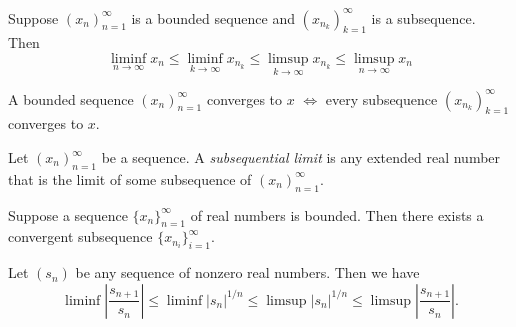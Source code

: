 \documentclass[../main.tex]{subfiles}
\begin{document}
    
    
    
    
    
    
    
    
    
    \begin{exercise}
    Suppose $ (x_n)^\infty_{n=1}$ is a bounded sequence and $ (x_{n_k})^\infty_{k = 1}$ is a subsequence. Then
    \[
    \liminf_{n \to \infty} x_n \leq \liminf_{k \to \infty} x_{n_k} \leq \limsup_{k \to \infty} x_{n_k} \leq \limsup_{n \to \infty} x_n
    \]
    \end{exercise}
    
    
    
    
    
    \begin{exercise}
    A bounded sequence $ (x_n)^\infty_{n=1}$ converges to $x$ $\iff$ every subsequence $ (x_{n_k})^\infty_{k = 1}$ converges to $x$.
    \end{exercise}
    
    
    
    
    \begin{definition}
    Let  $ (x_n)^\infty_{n=1}$ be a sequence. A \textit{subsequential limit} is any extended real number that is the limit of some subsequence of  $ (x_n)^\infty_{n=1}$.
        
    \end{definition}
    
    
    
    
    \begin{theorem} \label{thm: Bolzano-Weierstrass}
    Suppose a sequence \( \{x_n\}_{n=1}^{\infty} \) of real numbers is bounded. Then there exists a convergent subsequence \( \{x_{n_i}\}_{i=1}^{\infty} \).
    \end{theorem}
    
    
    
    
    
    
    
    
    
    
    
    \begin{exercise}
    Let $(s_n)$ be any sequence of nonzero real numbers. Then we have
    \[
    \liminf \left| \frac{s_{n+1}}{s_n} \right| 
    \leq \liminf |s_n|^{1/n} 
    \leq \limsup |s_n|^{1/n} 
    \leq \limsup \left| \frac{s_{n+1}}{s_n} \right|.
    \]
    
    \end{exercise}
    
\end{document}
